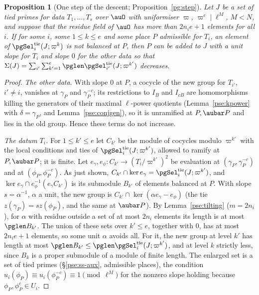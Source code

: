\documentclass[10pt]{amsart}
\newtheorem{proposition}[theorem]{Proposition}
\theoremstyle{definition}
\theoremstyle{remark}
\begin{document}
\begin{proposition}[One step of the descent; Proposition~\ref{pg:step}]\label{pse:step}
Let $J$ be a set of tied primes for data $T_1,\dots,T_s$ over $\auO$ with uniformiser $\varpi$,
$\varpi^e\mid\ell^M$, $M<N$, and suppose that the residue field of $\auO$ has more than $2n_ie+1$
elements for all $i$. If for some $i$, some $1\le k\le e$ and some place $P$ admissible for $T_i$, an
element of $\pgSel^{\mathrm{tie}}_i(J;\varpi^k)$ is not balanced at $P$, then $P$ can be added to $J$
with a unit slope for $T_i$ and slope $0$ for the other data so that
$\Sigma(J)=\sum_{i'}\sum_{k'=1}^e\pglen\pgSel_{i'}^{\mathrm{tie}}(J;\varpi^{k'})$ decreases.
\end{proposition}
\begin{proof}
\emph{The other data.} With slope $0$ at $P$, a cocycle of the new group for $T_{i'}$, $i'\ne i$,
vanishes at $\gamma_P$ and $\gamma_P^{-c}$; its restrictions to $I_{B}$ and $I_{cB}$ are
homomorphisms killing the generators of their maximal $\ell$-power quotients (Lemma~\ref{pse:kpower}
with $\delta=\gamma_P$, and Lemma~\ref{pse:conjgen}), so it is unramified at $P,\aubar P$ and lies in
the old group. Hence these terms do not increase.

\emph{The datum $T_i$.} For $1\le k'\le e$ let $C_{k'}$ be the module of cocycles modulo
$\varpi^{k'}$ with the local conditions and ties of $\pgSel^{\mathrm{tie}}_i(J;\varpi^{k'})$, allowed
to ramify at $P,\aubar P$; it is finite. Let $e_\gamma,e_\phi\colon C_{k'}\to(T_i/\varpi^{k'})^2$ be
evaluation at $(\gamma_P,\gamma_P^{-c})$ and at $(\phi_P,\phi_P^{-c})$. As just shown, $C_{k'}\cap\ker
e_\gamma=\pgSel_i^{\mathrm{tie}}(J;\varpi^{k'})$, and $\ker e_\gamma\cap e_\phi^{-1}(e_\gamma C_{k'})$
is its submodule $B_{k'}$ of elements balanced at $P$. With slope $s=\alpha^{-1}$, $\alpha$ a unit,
the new group is $C_{k'}\cap\ker(\alpha e_\gamma-e_\phi)$ (the tie $z(\gamma_P)=sz(\phi_P)$, and the
same at $\aubar P$). By Lemma~\ref{pse:tilting} ($m=2n_i$), for $\alpha$ with residue outside a set
of at most $2n_i$ elements its length is at most $\pglen B_{k'}$. The union of these sets over
$k'\le e$, together with $0$, has at most $2n_ie+1$ elements, so some unit $\alpha$ avoids all. For
it, the new group at level $k'$ has length at most $\pglen B_{k'}\le\pglen\pgSel_i^{\mathrm{tie}}
(J;\varpi^{k'})$, and at level $k$ strictly less, since $B_k$ is a proper submodule of a module of
finite length. The enlarged set is a set of tied primes (\S\ref{pse:ss-aux}, admissible places),
the condition $u_i(\phi_P)\equiv u_i(\phi_P^{-c})\equiv1\pmod{\ell^M}$ for the nonzero slope holding
because $\phi_P,\phi_P^c\in U_i$.
\end{proof}
\end{document}

